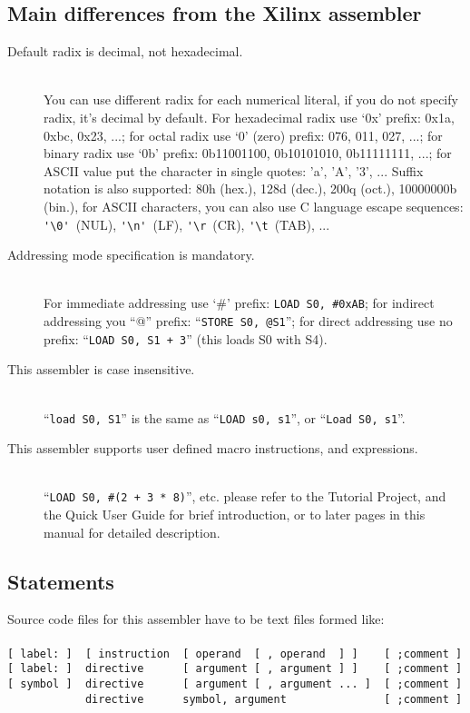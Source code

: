     \subsection{Main differences from the Xilinx assembler}
        \begin{description}
            \item[Default radix is decimal, not hexadecimal.]~\\
                You can use different radix for each numerical literal, if you do not specify radix, it's decimal by default. For hexadecimal radix use `0x' prefix: 0x1a, 0xbc, 0x23, ...; for octal radix use `0' (zero) prefix: 076, 011, 027, ...; for binary radix use `0b' prefix: 0b11001100, 0b10101010, 0b11111111, ...; for ASCII value put the character in single quotes: 'a', 'A', '3', ... Suffix notation is also supported: 80h (hex.), 128d (dec.), 200q (oct.), 10000000b (bin.), for ASCII characters, you can also use C language escape sequences: \verb"'\0'"~(NUL), \verb"'\n'"~(LF), \verb"'\r"~(CR), \verb"'\t"~(TAB), ...
            \item[Addressing mode specification is mandatory.]~\\
                For immediate addressing use `\#' prefix: \texttt{LOAD~S0,~\#0xAB}; for indirect addressing you ``@'' prefix: ``\texttt{STORE~S0,~@S1}''; for direct addressing use no prefix: ``\texttt{LOAD~S0,~S1~+~3}'' (this loads S0 with S4).
            \item[This assembler is case insensitive.]~\\
                ``\texttt{load~S0,~S1}'' is the same as ``\texttt{LOAD~s0,~s1}'', or ``\texttt{Load~S0,~s1}''.
            \item[This assembler supports user defined macro instructions, and expressions.]~\\
                ``\texttt{LOAD~S0,~\#(2~+~3~*~8)}'', etc. please refer to the Tutorial Project, and the Quick User Guide for brief introduction, or to later pages in this manual for detailed description.
        \end{description}

    \subsection{Statements}
        Source code files for this assembler have to be text files formed like:\\
        ~\\
        \verb'[ label: ]  [ instruction  [ operand  [ , operand  ] ]    [ ;comment ]'\\
        \verb'[ label: ]  directive      [ argument [ , argument ] ]    [ ;comment ]'\\
        \verb'[ symbol ]  directive      [ argument [ , argument ... ]  [ ;comment ]'\\
        \verb'            directive      symbol, argument               [ ;comment ]'\\

